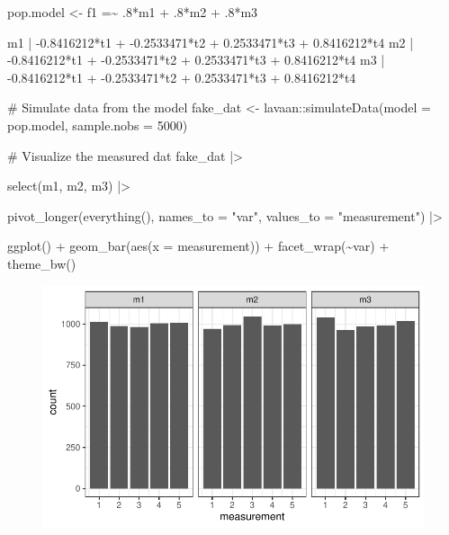 \documentclass[
  letterpaper,
  DIV=11,
  numbers=noendperiod]{scrreprt}
\newenvironment{Shaded}{\begin{snugshade}}{\end{snugshade}}
\newcommand{\AttributeTok}[1]{\textcolor[rgb]{0.40,0.45,0.13}{#1}}
\newcommand{\CommentTok}[1]{\textcolor[rgb]{0.37,0.37,0.37}{#1}}
\newcommand{\DecValTok}[1]{\textcolor[rgb]{0.68,0.00,0.00}{#1}}
\newcommand{\FunctionTok}[1]{\textcolor[rgb]{0.28,0.35,0.67}{#1}}
\newcommand{\NormalTok}[1]{\textcolor[rgb]{0.00,0.23,0.31}{#1}}
\newcommand{\OtherTok}[1]{\textcolor[rgb]{0.00,0.23,0.31}{#1}}
\newcommand{\SpecialCharTok}[1]{\textcolor[rgb]{0.37,0.37,0.37}{#1}}
\newcommand{\StringTok}[1]{\textcolor[rgb]{0.13,0.47,0.30}{#1}}
\begin{document}
\begin{Shaded}
\begin{Highlighting}[]
\NormalTok{pop.model }\OtherTok{\textless{}{-}} \StringTok{\textquotesingle{} }
\StringTok{  f1 =\textasciitilde{} .8*m1 + .8*m2 + .8*m3}

\StringTok{  m1 | {-}0.8416212*t1 + {-}0.2533471*t2 + 0.2533471*t3 + 0.8416212*t4}
\StringTok{  m2 | {-}0.8416212*t1 + {-}0.2533471*t2 + 0.2533471*t3 + 0.8416212*t4}
\StringTok{  m3 | {-}0.8416212*t1 + {-}0.2533471*t2 + 0.2533471*t3 + 0.8416212*t4}
\StringTok{\textquotesingle{}}

\CommentTok{\# Simulate data from the model}
\NormalTok{fake\_dat }\OtherTok{\textless{}{-}}\NormalTok{ lavaan}\SpecialCharTok{::}\FunctionTok{simulateData}\NormalTok{(}\AttributeTok{model =}\NormalTok{ pop.model, }\AttributeTok{sample.nobs =} \DecValTok{5000}\NormalTok{)}

\CommentTok{\# Visualize the measured dat}
\NormalTok{fake\_dat }\SpecialCharTok{|\textgreater{}}

  \FunctionTok{select}\NormalTok{(m1, m2, m3) }\SpecialCharTok{|\textgreater{}} 
  
  \FunctionTok{pivot\_longer}\NormalTok{(}\FunctionTok{everything}\NormalTok{(), }\AttributeTok{names\_to =} \StringTok{"var"}\NormalTok{, }\AttributeTok{values\_to =} \StringTok{"measurement"}\NormalTok{) }\SpecialCharTok{|\textgreater{}}

  \FunctionTok{ggplot}\NormalTok{() }\SpecialCharTok{+}
  \FunctionTok{geom\_bar}\NormalTok{(}\FunctionTok{aes}\NormalTok{(}\AttributeTok{x =}\NormalTok{ measurement)) }\SpecialCharTok{+}
  \FunctionTok{facet\_wrap}\NormalTok{(}\SpecialCharTok{\textasciitilde{}}\NormalTok{var) }\SpecialCharTok{+}
  \FunctionTok{theme\_bw}\NormalTok{()}
\end{Highlighting}
\end{Shaded}

\begin{figure}[H]

{\centering \includegraphics{./simulating-cfa-data_files/figure-pdf/unnamed-chunk-5-1.pdf}

}

\end{figure}
\end{document}
